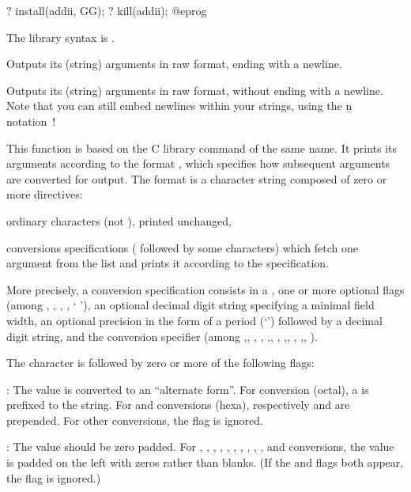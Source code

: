 ? install(addii, GG);
? kill(addii);
@eprog

The library syntax is .

\label{se:print}
Outputs its (string) arguments in raw format, ending with a newline.

\label{se:print1}
Outputs its (string) arguments in raw
format, without ending with a newline. Note that you can still embed newlines
within your strings, using the \b{n} notation~!

\label{se:printf}
This function is based on the C library command of the same name.
It prints its arguments according to the format , which specifies how
subsequent arguments are converted for output. The format is a
character string composed of zero or more directives:

\item ordinary characters (not \kbd{\%}), printed unchanged,

\item conversions specifications (\kbd{\%} followed by some characters)
which fetch one argument from the list and prints it according to the
specification.

More precisely, a conversion specification consists in a \kbd{\%}, one or more
optional flags (among \kbd{\#}, , \kbd{-}, \kbd{+}, ` '), an optional
decimal digit string specifying a minimal field width, an optional precision
in the form of a period (`') followed by a decimal digit string, and
the conversion specifier (among ,, , ,
,, , ,, , ,, ).

 The character \kbd{\%} is followed by zero or
more of the following flags:

\item \kbd{\#}: The value is converted to an ``alternate form''. For
 conversion (octal), a  is prefixed to the string. For 
and  conversions (hexa), respectively  and  are
prepended. For other conversions, the flag is ignored.

\item {}: The value should be zero padded. For
,
,
,
,
,
,
,
,
,
, and
 conversions, the value is padded on the left with zeros rather than
blanks. (If the  and \kbd{-} flags both appear, the  flag is
ignored.)


